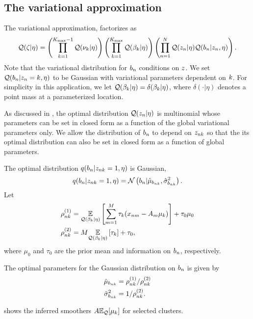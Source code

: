 \subsection{The variational approximation}
The variational approximation, factorizes as
\begin{align*}
\mathcal{Q}(\zeta \vert \eta) =
    \left( \prod_{k=1}^{{K_{\mathrm{max}}} - 1} \mathcal{Q}(\nu_{k} \vert \eta) \right)
    \left( \prod_{k=1}^{{K_{\mathrm{max}}}} \mathcal{Q}(\beta_k \vert \eta) \right)
    \left( \prod_{n=1}^{N} \mathcal{Q}(z_{n} \vert \eta)
    \mathcal{Q}(b_{n} \vert z_{n}, \eta)\right).
\end{align*}
Note that the variational distribution for $b_n$ conditions on $z$.
We set $\mathcal{Q}(b_{n} \vert z_{n} = k, \eta)$ to be Gaussian
with variational parameters dependent on $k$.
For simplicity in this application,
we let $\mathcal{Q}(\beta_k \vert \eta) = \delta (\beta_k \vert \eta)$,
where $\delta(\cdot \vert \eta)$ denotes a point mass at a parameterized location.

As discussed in ,
the optimal distribution $\mathcal{Q}(z_n\vert\eta)$ is multinomial whose parameters
can be set in closed form as a function of the global variational parameters only.
We allow the distribution of $b_n$ to depend on $z_{nk}$ so that
the its optimal distribution can also be set in closed form as a function of
global parameters.

The optimal distribution $q(b_n\vert z_{nk} = 1, \eta)$ is Gaussian,
\begin{align*}
q(b_n\vert z_{nk} = 1, \eta) = \mathcal{N}\left(b_n \vert \hat\mu_{b_{nk}}, \hat\sigma^2_{b_{nk}}\right).
\end{align*}
Let
\begin{align*}
  \rho^{(1)}_{nk} &= \underset{\mathcal{Q}(\beta_k|\eta)}{\mathbb{E}}\left[\sum_{m=1}^M \tau_{k}(x_{nm} - A_m\mu_k)\right] +
  \tau_0 \mu_0 \\
  \rho^{(2)}_{nk} &= M \underset{\mathcal{Q}(\beta_k|\eta)}{\mathbb{E}}\left[\tau_{k}\right] + \tau_0,
\end{align*}
where $\mu_0$ and $\tau_0$ are the prior mean and information on $b_n$, respectively.

The optimal parameters for the Gaussian distribution on $b_n$ is given by
\begin{align*}
  \hat\mu_{b_{nk}} &= \rho^{(1)}_{nk} / \rho^{(2)}_{nk}\\
  \hat\sigma^2_{b_{nk}} &= 1 / \rho^{(2)}_{nk}.
\end{align*}

 shows the inferred smoothers 
$A\mathbb{E}_{\mathcal{Q}}[\mu_k]$ for selected clusters. 
\MiceSmoothers

